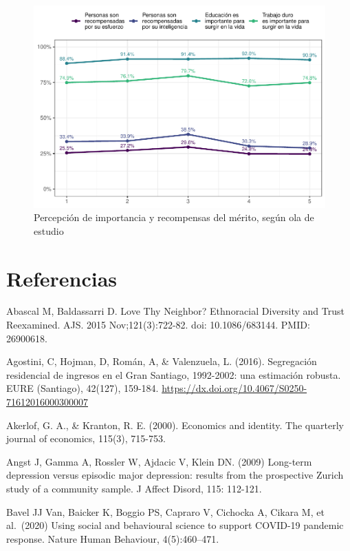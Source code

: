 \documentclass[
  12pt,
]{book}
\begin{document}
\begin{figure}

{\centering \includegraphics{reporte-elsoc_files/figure-latex/merit-wave-1} 

}

\caption{Percepción de importancia y recompensas del mérito, según ola de estudio}\label{fig:merit-wave}
\end{figure}

\hypertarget{referencias}{%
\chapter*{Referencias}\label{referencias}}

Abascal M, Baldassarri D. Love Thy Neighbor? Ethnoracial Diversity and Trust Reexamined. AJS. 2015 Nov;121(3):722-82. doi: 10.1086/683144. PMID: 26900618.

Agostini, C, Hojman, D, Román, A, \& Valenzuela, L. (2016). Segregación residencial de ingresos en el Gran Santiago, 1992-2002: una estimación robusta. EURE (Santiago), 42(127), 159-184. \url{https://dx.doi.org/10.4067/S0250-71612016000300007}

Akerlof, G. A., \& Kranton, R. E. (2000). Economics and identity. The quarterly journal of economics, 115(3), 715-753.

Angst J, Gamma A, Rossler W, Ajdacic V, Klein DN. (2009) Long-term depression versus episodic major depression: results from the prospective Zurich study of a community sample. J Affect Disord, 115: 112-121.

Bavel JJ Van, Baicker K, Boggio PS, Capraro V, Cichocka A, Cikara M, et al.~(2020) Using social and behavioural science to support COVID-19 pandemic response. Nature Human Behaviour, 4(5):460--471.
\end{document}
